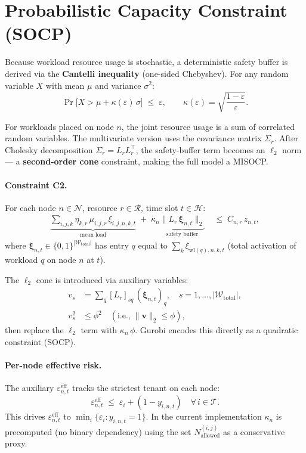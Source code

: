\documentclass[11pt,a4paper]{article}
\newcommand{\cT}{\mathcal{T}}           %
\newcommand{\cW}{\mathcal{W}}           %
\newcommand{\cN}{\mathcal{N}}           %
\newcommand{\cR}{\mathcal{R}}           %
\newcommand{\cH}{\mathcal{H}}           %
\newcommand{\kap}{\kappa}               %
\newcommand{\eps}{\varepsilon}          %
\begin{document}
\section{Probabilistic Capacity Constraint (SOCP)}
\label{sec:socp}

Because workload resource usage is stochastic, a deterministic safety buffer
is derived via the \textbf{Cantelli inequality} (one-sided Chebyshev).  For
any random variable $X$ with mean $\mu$ and variance $\sigma^2$:
\[
  \Pr\!\bigl[X > \mu + \kap(\eps)\,\sigma\bigr] \;\le\; \eps,
  \qquad
  \kap(\eps) = \sqrt{\frac{1-\eps}{\eps}}.
\]

For workloads placed on node $n$, the joint resource usage is a sum of
correlated random variables.  The multivariate version uses the covariance
matrix $\Sigma_r$.  After Cholesky decomposition $\Sigma_r = L_r L_r^\top$,
the safety-buffer term becomes an $\ell_2$ norm --- a \textbf{second-order
cone} constraint, making the full model a MISOCP.

\paragraph{Constraint C2.}\label{c2}
For each node $n\in\cN$, resource $r\in\cR$, time slot $t\in\cH$:
\begin{align}
  \underbrace{\sum_{i,j,k} \eta_{k,r}\,\mu_{i,j,r}\,\xi_{i,j,n,k,t}}_{\text{mean load}}
  \;+\;
  \kap_n \underbrace{\bigl\|L_r\,\boldsymbol{\xi}_{n,t}\bigr\|_2}_{\text{safety buffer}}
  &\;\le\; C_{n,r}\,z_{n,t},
  \label{eq:c2}
\end{align}
where $\boldsymbol{\xi}_{n,t}\in\{0,1\}^{|\cW_{\text{total}}|}$ has entry
$q$ equal to $\sum_k \xi_{\text{wl}(q),n,k,t}$ (total activation of
workload $q$ on node $n$ at $t$).

The $\ell_2$ cone is introduced via auxiliary variables:
\begin{align*}
  v_s &= \sum_{q} [L_r]_{sq}\,(\boldsymbol{\xi}_{n,t})_q,
  \quad s=1,\ldots,|\cW_{\text{total}}|, \\
  v_s^2 &\le \phi^2 \quad(\text{i.e.,}\;\|\mathbf{v}\|_2 \le \phi),
\end{align*}
then replace the $\ell_2$ term with $\kap_n\,\phi$. Gurobi encodes this
directly as a quadratic constraint (SOCP).

\paragraph{Per-node effective risk.}
The auxiliary $\eps_{n,t}^{\text{eff}}$ tracks the strictest tenant on each node:
\[
  \eps_{n,t}^{\text{eff}} \;\le\; \eps_i + (1 - y_{i,n,t})
  \quad \forall\,i\in\cT.
\]
This drives $\eps_{n,t}^{\text{eff}}$ to $\min_i\{\eps_i : y_{i,n,t}=1\}$.
In the current implementation $\kap_n$ is precomputed (no binary dependency)
using the set $N_{\text{allowed}}^{(i,j)}$ as a conservative proxy.
\end{document}
